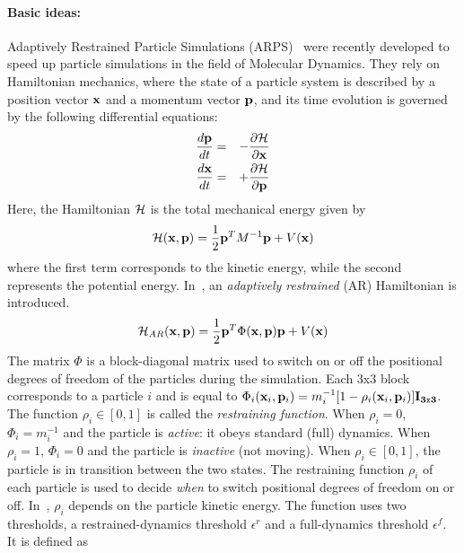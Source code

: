 \paragraph*{Basic ideas:}
Adaptively Restrained Particle Simulations (ARPS)~\cite{Artemova2012} were recently developed to speed up particle simulations in the field of Molecular Dynamics.
They rely on Hamiltonian mechanics, where the state of a particle system is described by a position vector $\mathbf{x}$ and a momentum vector $\mathbf{p}$, and its time evolution is governed by the following differential equations:
\begin{eqnarray*}
\frac{d\mathbf{p}}{dt} &=& -\frac{\partial \mathcal{H}}{\partial \mathbf{x}} \\
\frac{d\mathbf{x}}{dt} &=& +\frac{\partial \mathcal{H}}{\partial \mathbf{p}}
\end{eqnarray*}
Here, the Hamiltonian $\mathcal{H}$ is the total mechanical energy given by
\begin{equation}
    \label{eq:hamiltonian}
    \mathcal{H}(\mathbf{x},\mathbf{p}) = \frac{1}{2} \mathbf{p}^{T}M^{-1}\mathbf{p} + V(\mathbf{x})
\end{equation}
where the first term corresponds to the kinetic energy, while the second represents the potential energy.
In~\cite{Artemova2012}, an \textit{adaptively restrained} (AR) Hamiltonian is introduced.
\begin{equation}
    \label{eq:arhamiltonian}
    \mathcal{H}_{AR}(\mathbf{x}, \mathbf{p}) = \frac{1}{2} \mathbf{p}^{T}\Phi(\mathbf{x},\mathbf{p})\mathbf{p} + V(\mathbf{x})
\end{equation}
The matrix $\Phi$ is a block-diagonal matrix used to switch on or off the positional degrees of freedom of the particles during the simulation.
Each $3$x$3$ block corresponds to a particle $i$ and is equal to
$\Phi_{i}(\mathbf{x}_{i}, \mathbf{p}_{i}) = m_{i}^{-1}[1 - \rho_{i}(\mathbf{x}_{i}, \mathbf{p}_{i})]\mathbf{I_{3\mathtt{x}3}}$.
The function $\rho_{i} \in [0, 1]$ is called the \emph{restraining function}.
When $\rho_{i} = 0$, $\Phi_{i} = m_{i}^{-1}$ and the particle is \textit{active}: it obeys standard (full) dynamics.
When $\rho_{i} = 1$, $\Phi_{i} = 0$ and the particle is \textit{inactive} (not moving). When $\rho_{i} \in [0, 1]$, the particle is in transition between the two states.
The restraining function $\rho_{i}$ of each particle is used to decide \emph{when} to switch positional degrees of freedom on or off.
In~\cite{Artemova2012}, $\rho_{i}$ depends on the particle kinetic energy.
The function uses two thresholds, a restrained-dynamics threshold $\epsilon^{r}$ and a full-dynamics threshold $\epsilon^{f}$.
It is defined as

